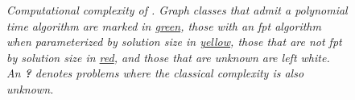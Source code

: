 \begin{center}
\begin{table}[ht]
\begin{minipage}[th]{\linewidth}
{\begin{tabularx}{1.5\textwidth}{lllllll}
        
        
        \midrule
        \bottomrule
    \end{tabularx}
}
\end{minipage}
    \end{table}
\end{center}


\begin{figure}
    \centering
    \resizebox{1.0\textwidth}{!}{
        
    }
    \caption[Graph inclusions]{\textit{Computational complexity of \sdom. Graph classes that admit a polynomial time algorithm are marked in {\ul{green}}, those with an fpt algorithm when parameterized by solution size in {\ul{yellow}}, those that are not fpt by solution size in {\ul{red}}, and those that are unknown are left \textit{white}.
    An \textbf{?} denotes problems where the classical complexity is also unknown.}}
    
    \label{fig:bigpicture}
\end{figure}